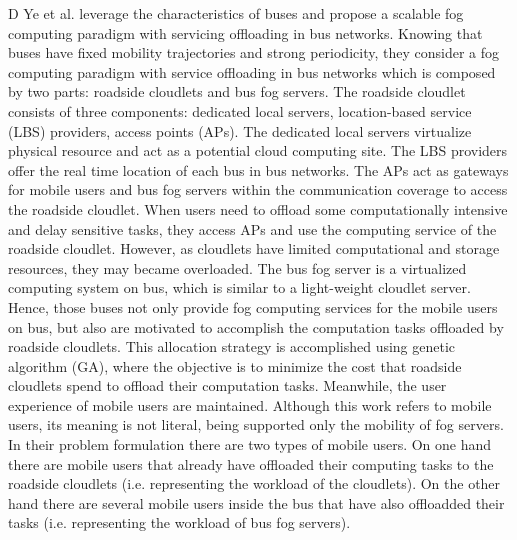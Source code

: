 \noindent\tab D Ye et al. \cite{ye2016scalable} leverage the characteristics of buses and propose a scalable fog computing paradigm with servicing offloading in bus networks. Knowing that buses have fixed mobility trajectories and strong periodicity, they consider a fog computing paradigm with service offloading in bus networks which is composed by two parts: roadside cloudlets and bus fog servers. The roadside cloudlet consists of three components: dedicated local servers, location-based service (LBS) providers, access points (APs). The dedicated local servers virtualize physical resource and act as a potential cloud computing site. The LBS providers offer the real time location of each bus in bus networks. The APs act as gateways for mobile users and bus fog servers within the communication coverage to access the roadside cloudlet. When users need to offload some computationally intensive and delay sensitive tasks, they access APs and use the computing service of the roadside cloudlet. However, as cloudlets have limited computational and storage resources, they may became overloaded. The bus fog server is a virtualized computing system on bus, which is similar to a light-weight cloudlet server. Hence, those buses not only provide fog computing services for the mobile users on bus, but also are motivated to accomplish the computation tasks offloaded by roadside cloudlets. This allocation strategy is accomplished using genetic algorithm (GA), where the objective is to minimize the cost that roadside cloudlets spend to offload their computation tasks. Meanwhile, the user experience of mobile users are maintained. Although this work refers to mobile users, its meaning is not literal, being supported only the mobility of fog servers. In their problem formulation there are two types of mobile users. On one hand there are mobile users that already have offloaded their computing tasks to the roadside cloudlets (i.e. representing the workload of the cloudlets). On the other hand there are several mobile users inside the bus that have also offloadded their tasks (i.e. representing the workload of bus fog servers).

